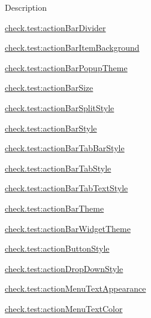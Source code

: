 Description 

{\ttfamily \hyperlink{classcheck_1_1test_1_1_r_1_1styleable_a24a4a7345478079d2842c3c6b948cee8}{check.\+test\+:action\+Bar\+Divider}}

{\ttfamily \hyperlink{classcheck_1_1test_1_1_r_1_1styleable_a0452c18018a280bc2c98c290c760c4de}{check.\+test\+:action\+Bar\+Item\+Background}}

{\ttfamily \hyperlink{classcheck_1_1test_1_1_r_1_1styleable_a73283effe9ac39eb90c34200c9d71c48}{check.\+test\+:action\+Bar\+Popup\+Theme}}

{\ttfamily \hyperlink{classcheck_1_1test_1_1_r_1_1styleable_af17d29383b2372457182672f93aeb8e6}{check.\+test\+:action\+Bar\+Size}}

{\ttfamily \hyperlink{classcheck_1_1test_1_1_r_1_1styleable_a9f5d8b45ed85a61b92f887aa336f3adf}{check.\+test\+:action\+Bar\+Split\+Style}}

{\ttfamily \hyperlink{classcheck_1_1test_1_1_r_1_1styleable_a08cd7000f459aa75d7817e7a3a7c3229}{check.\+test\+:action\+Bar\+Style}}

{\ttfamily \hyperlink{classcheck_1_1test_1_1_r_1_1styleable_a4f15c7fba5e3c2d9c43d6e29262b809b}{check.\+test\+:action\+Bar\+Tab\+Bar\+Style}}

{\ttfamily \hyperlink{classcheck_1_1test_1_1_r_1_1styleable_ac7c5d9db6774de90f8feae957a5c9525}{check.\+test\+:action\+Bar\+Tab\+Style}}

{\ttfamily \hyperlink{classcheck_1_1test_1_1_r_1_1styleable_a1733f98ca23b42c6fdd6a6e560392fc2}{check.\+test\+:action\+Bar\+Tab\+Text\+Style}}

{\ttfamily \hyperlink{classcheck_1_1test_1_1_r_1_1styleable_a0c926c0b572d1a456f5181c48e9b6eef}{check.\+test\+:action\+Bar\+Theme}}

{\ttfamily \hyperlink{classcheck_1_1test_1_1_r_1_1styleable_a11aebf359000ff5df5b3cb3760b461ca}{check.\+test\+:action\+Bar\+Widget\+Theme}}

{\ttfamily \hyperlink{classcheck_1_1test_1_1_r_1_1styleable_a15e83ab3003cd39702fb77872405c667}{check.\+test\+:action\+Button\+Style}}

{\ttfamily \hyperlink{classcheck_1_1test_1_1_r_1_1styleable_a1701f361e9f3c65f693656182107e83b}{check.\+test\+:action\+Drop\+Down\+Style}}

{\ttfamily \hyperlink{classcheck_1_1test_1_1_r_1_1styleable_af897628603939c74ea86e5ec3ba329a4}{check.\+test\+:action\+Menu\+Text\+Appearance}}

{\ttfamily \hyperlink{classcheck_1_1test_1_1_r_1_1styleable_a46f47f45868d12945f240329c3a79fe7}{check.\+test\+:action\+Menu\+Text\+Color}}

